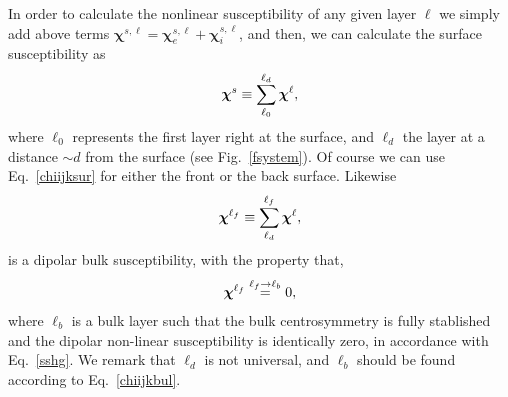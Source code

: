 \documentclass[floatfix,prb,aps,superscriptaddress,11pt,preprint]{revtex4}
\begin{document}
In order to calculate
the nonlinear susceptibility of any given layer $\ell$ we simply add above terms
$\boldsymbol{\chi}^{s,\ell}=\boldsymbol{\chi}_e^{s,\ell}+\boldsymbol{\chi}_i^{s,\ell}$, 
and 
then,
we can calculate the surface
susceptibility as 
\begin{equation}\label{chiijksur}
\boldsymbol{\chi}^s\equiv \sum_{\ell_0}^{\ell_d}\boldsymbol{\chi}^{\ell},
\end{equation}
where $\ell_0$ represents the first  layer right at the surface, and $\ell_d$ the
layer at a distance $\sim d$ from the surface (see
Fig.~\ref{fsystem}). Of course we can use Eq.~\eqref{chiijksur} for
either the front or the back surface.
Likewise
\begin{equation}\label{chiijklf}
\boldsymbol{\chi}^{\ell_f}\equiv \sum_{\ell_d}^{\ell_f}\boldsymbol{\chi}^{\ell},
\end{equation}
is a dipolar bulk susceptibility, with the property that,
\begin{equation}\label{chiijkbul}
\boldsymbol{\chi}^{\ell_f}\stackrel{\ell_f \to \ell_b}{=} 0,
\end{equation}
where $\ell_b$ is a bulk layer such that the bulk centrosymmetry is
fully stablished and the dipolar non-linear susceptibility is
identically zero, in accordance with Eq.~\eqref{sshg}. We remark that 
$\ell_d$  is
not universal, and $\ell_b$ should be found according to Eq.~\eqref{chiijkbul}. 
\end{document}
